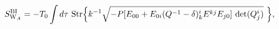 \begin{equation}
\label{IIAwavesBI}
S^{\rm BI}_{{\rm W}_A}=-T_0\int d\tau~ {\rm Str}\Bigl\{ k^{-1}
\sqrt{-P[E_{00}+E_{0i}(Q^{-1}-\delta)^i_k
E^{kj}E_{j0}] \ {\rm det} (Q^i_j )}
\ \Bigr\},
\end{equation}

